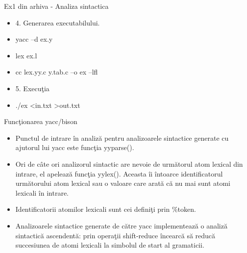 \documentclass[pdf]{beamer}
\begin{document}
\begin{frame}{Ex1 din arhiva - Analiza sintactica}
\begin{itemize}
	\item
	4. Generarea executabilului.

	\item[]
	yacc –d ex.y

	\item[]
	lex ex.l

	\item[]
	cc lex.yy.c y.tab.c –o ex –lfl
		\linebreak

	\item
	5. Execuţia

	\item[]
	./ex <in.txt >out.txt

\end{itemize}
\end{frame}



\begin{frame}{Funcţionarea yacc/bison}
\begin{itemize}
	\item
	Punctul de intrare în analiză pentru analizoarele sintactice generate cu ajutorul lui yacc este funcţia yyparse(). 

	\item
	Ori de câte ori analizorul sintactic are nevoie de următorul atom lexical din intrare, el apelează funcţia yylex(). Aceasta îi întoarce identificatorul următorului atom lexical sau o valoare care arată că nu mai sunt atomi lexicali în intrare.


	\item
	Identificatorii atomilor lexicali sunt cei definiţi prin \%token.

	\item
	Analizoarele sintactice generate de către yacc implementează o analiză sintactică ascendentă: prin operaţii shift-reduce încearcă să reducă succesiunea de atomi lexicali la simbolul de start al gramaticii.

\end{itemize}
\end{frame}
\end{document}
